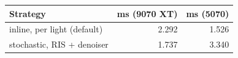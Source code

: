 \begin{tabular}{lrr}
\toprule
Strategy & ms (9070 XT) & ms (5070) \\
\midrule
inline, per light (default) & 2.292 & 1.526 \\
stochastic, RIS + denoiser & 1.737 & 3.340 \\
\bottomrule
\end{tabular}
